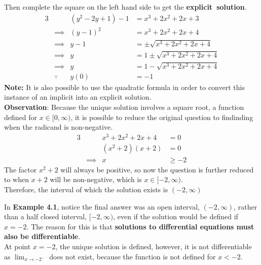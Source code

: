 \documentclass[twoside]{report}
\begin{document}
    \begin{example*}[4.1 (cont.)]
        Then complete the square on the left hand side to get the \textbf{explicit~solution}.
        \begin{alignat}{3}
            && (y^{2} - 2y + 1) - 1 &= x^{3} + 2x^{2} + 2x + 3\\
            &\implies &(y - 1)^{2} &= x^{3} + 2x^{2} + 2x + 4\\
            &\implies & y - 1 &= \pm \sqrt{x^{3}  + 2x^{2} + 2x + 4}\\
            &\implies & y &= 1 \pm \sqrt{x^{3}  + 2x^{2} + 2x + 4}\\
            &\implies & y &= 1 - \sqrt{x^{3}  + 2x^{2} + 2x + 4}\\
            &\because & y(0) &= -1
        \end{alignat}
        \textbf{Note:} It is also possible to use the quadratic formula in order to convert this instance of an implicit into an explicit solution.\\
        \textbf{Observation}: Because the unique solution involves a square root, a function defined for $x \in [0, \infty)$, it is possible to reduce the original question to findinding when the radicand is non-negative.
        \begin{alignat}{3}
            &&x^{3} + 2 x^{2} + 2x + 4\ &= 0\\
            &&(x^{2} + 2)(x + 2) &= 0\\
            &\implies&x &\geq -2
        \end{alignat}
        The factor $x^{2} + 2$ will always be positive, so now the question is further reduced to when $x + 2$ will be non-negative, which is $x \in [-2, \infty)$.\\
        Therefore, the interval of which the solution exists is $(-2, \infty)$
    \end{example*}
    \begin{remark}
        In \textbf{Example 4.1}, notice the final answer was an open interval, $(-2, \infty)$, rather than a half closed interval, $[-2, \infty)$, even if the solution would be defined if $x = -2$. The reason for this is that \textbf{solutions to differential equations must also be differentiable}.\\
        At point $x = -2$, the unique solution is defined, however, it is not differentiable as $\lim_{x \to -2^{-}}$ does not exist, because the function is not defined for $x < -2$.
    \end{remark}
\end{document}
